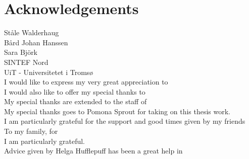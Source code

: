 \clearpage 

\chapter{Acknowledgements}
    
    
    Ståle Walderhaug	\\
	Bård Johan Hanssen\\
    Sara Björk \\
	SINTEF Nord\\
 	UiT - Universitetet i Tromsø\\
 	
    I would like to express my very great appreciation to\\
    I would also like to offer my special thanks to \\
    My special thanks are extended to the staff of \\
    My special thanks goes to Pomona Sprout for taking on this thesis work.\\
    I am particularly grateful for the support and good times given by my friends \\    
    To my family, for \\
    I am particularly grateful.    \\
    Advice given by Helga Hufflepuff has been a great help in \\


 
 
 
